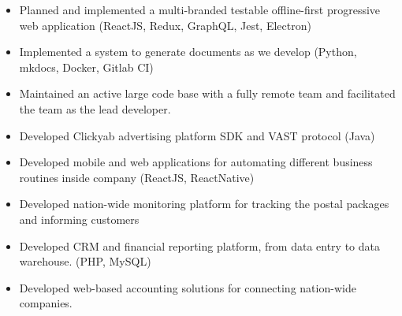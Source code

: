\documentclass[10pt,a4paper,ragged2e]{altacv}
\begin{document}
\begin{itemize}
\item Planned and implemented a multi-branded testable offline-first progressive web application (ReactJS, Redux, GraphQL, Jest, Electron)
\item Implemented a system to generate documents as we develop (Python, mkdocs, Docker, Gitlab CI)
\item Maintained an active large code base with a fully remote team and facilitated the team as the lead developer.
\end{itemize}

\divider




\begin{itemize}
\item Developed Clickyab advertising platform SDK and VAST protocol (Java)
\end{itemize}

\divider

\begin{itemize}
\item Developed mobile and web applications for automating different business
  routines inside company (ReactJS, ReactNative)
\item Developed nation-wide monitoring platform for tracking the postal packages and informing customers
\end{itemize}
 
 \divider

\begin{itemize}
\item Developed CRM and financial reporting platform, from data entry
  to data warehouse. (PHP, MySQL)
\item Developed web-based accounting solutions for connecting nation-wide companies.
\end{itemize} 
\end{document}
